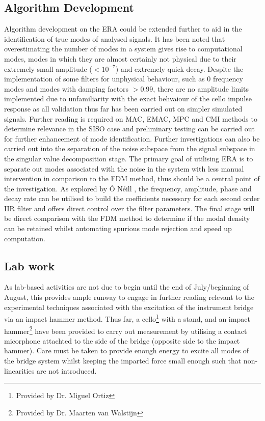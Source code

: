 \subsection{Algorithm Development}
Algorithm development on the ERA could be extended further to aid in the identification of true modes of analysed signals. It has been noted that overestimating the number of modes in a system gives rise to computational modes, modes in which they are almost certainly not physical due to their extremely small amplitude ($<10^{-7}$) and extremely quick decay.
Despite the implementation of some filters for unphysical behaviour, such as 0 frequency modes and modes with damping factors $>0.99$, there are no amplitude limits implemented due to unfamiliarity with the exact behvaiour of the cello impulse response as all validation thus far has been carried out on simpler simulated signals.
Further reading is required on MAC, EMAC, MPC and CMI methods to determine relevance in the SISO case and preliminary testing can be carried out for further enhancement of mode identification. Further investigations can also be carried out into the separation of the noise subspace from the signal subspace in the singular value decomposition stage. The primary goal of utilising ERA is to separate out modes associated with the noise in the system with less manual intervention in comparison to the FDM method, thus should be a central point of the investigation.
As explored by Ó Néill \cite{oneill}, the frequency, amplitude, phase and decay rate can be utilised to build the coefficients necessary for each second order IIR filter and offers direct control over the filter parameters. The final stage will be direct comparison with the FDM method to determine if the modal density can be retained whilst automating spurious mode rejection and speed up computation.

\subsection{Lab work}
As lab-based activities are not due to begin until the end of July/beginning of August, this provides ample runway to engage in further reading relevant to the experimental techniques associated with the excitation of the instrument bridge via an impact hammer method. Thus far, a cello\footnote{Provided by Dr. Miguel Ortiz} with a stand, and an impact hammer\footnote{Provided by Dr. Maarten van Walstijn} have been provided to carry out measurement by utilising a contact micorphone attachted to the side of the bridge (opposite side to the impact hammer).
Care must be taken to provide enough energy to excite all modes of the bridge system whilst keeping the imparted force small enough such that non-linearities are not introduced.
